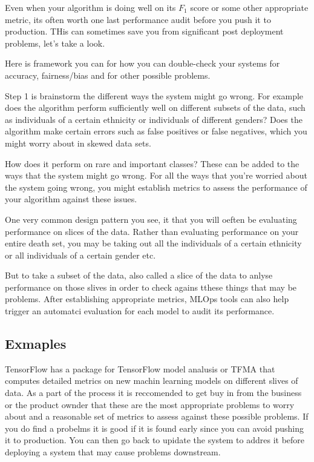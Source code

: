 Even when your algorithm is doing well on its $F_1$ score or some other appropriate metric, its often worth one last performance audit before you push it to production.
THis can sometimes save you from significant post deployment problems, let's take a look.

Here is framework you can for how you can double-check your systems for accuracy, fairness/bias and for other possible problems.

Step 1 is brainstorm the different ways the system might go wrong.
For example does the algorithm perform sufficiently well on different subsets of the data, such as individuals of a certain ethnicity or individuals of different genders?
Does the algorithm make certain errors such as false positives or false negatives, which you might worry about in skewed data sets.

How does it perform on rare and important classes? These can be added to the ways that the system might go wrong.
For all the ways that you're worried about the system going wrong, you might establish metrics to assess the performance of your algorithm against these issues.

One very common design pattern you see, it that you will oeften be evaluating performance on slices of the data.
Rather than evaluating performance on your entire death set, you may be taking out all the individuals of a certain ethnicity or all individuals of a certain gender etc.

But to take a subset of the data, also called a slice of the data to anlyse performance on those slives in order to check agains tthese things that may be problems.
After establishing appropriate metrics, MLOps tools can also help trigger an automatci evaluation for each model to audit its performance.

\subsection{Exmaples}
TensorFlow has a package for TensorFlow model analusis or TFMA that computes detailed metrics on new machin learning models on different slives of data.
As a part of the process it is reccomended to get buy in from the business or the product ownder that these are the most appropriate problems to worry about and a reasonable set of metrics to assess against these possible problems.
If you do find a probelms it is good if it is found early since you can avoid pushing it to production.
You can then go back to upidate the system to addres it before deploying a system that may cause problems downstream.

